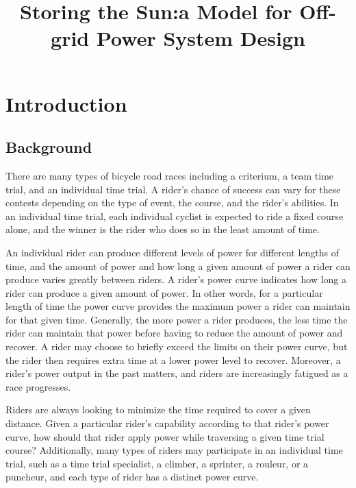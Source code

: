 \documentclass[12pt]{article}
\begin{document}

\clearpage
\pagestyle{fancy}
\newpage
\setcounter{page}{1}
\title{Storing the Sun:a Model for Off-grid Power System Design}
\Large
\maketitle
\tableofcontents   %
\newpage
\section{Introduction}
\subsection{Background}

There are many types of bicycle road races including a criterium, a team time trial, and an
individual time trial. A rider’s chance of success can vary for these contests depending on the
type of event, the course, and the rider’s abilities. In an individual time trial, each individual
cyclist is expected to ride a fixed course alone, and the winner is the rider who does so in the
least amount of time.

An individual rider can produce different levels of power for different lengths of time, and the
amount of power and how long a given amount of power a rider can produce varies greatly
between riders. A rider’s power curve indicates how long a rider can produce a given amount of
power. In other words, for a particular length of time the power curve provides the maximum
power a rider can maintain for that given time. Generally, the more power a rider produces, the
less time the rider can maintain that power before having to reduce the amount of power and
recover. A rider may choose to briefly exceed the limits on their power curve, but the rider then
requires extra time at a lower power level to recover. Moreover, a rider’s power output in the
past matters, and riders are increasingly fatigued as a race progresses.

Riders are always looking to minimize the time required to cover a given distance. Given a
particular rider’s capability according to that rider’s power curve, how should that rider apply
power while traversing a given time trial course? Additionally, many types of riders may
participate in an individual time trial, such as a time trial specialist, a climber, a sprinter, a
rouleur, or a puncheur, and each type of rider has a distinct power curve.
\end{document}
